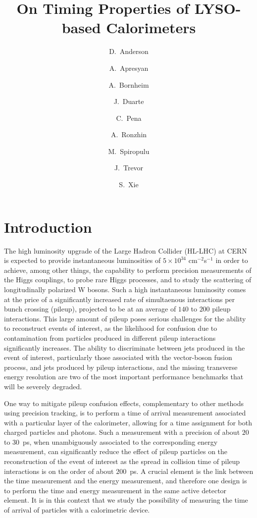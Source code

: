 \documentclass[12pt]{article}
\title{On Timing Properties of LYSO-based Calorimeters}
\author[1]{D.~Anderson}
\author[1]{A.~Apresyan}
\author[1]{A.~Bornheim}
\author[1]{J.~Duarte}
\author[1]{C.~Pena}
\author[2]{A.~Ronzhin}
\author[1]{M.~Spiropulu}
\author[1]{J.~Trevor}
\author[1]{S.~Xie}
\affil[1]{California Institute of Technology, Pasadena, CA, USA}
\affil[2]{Fermi National Accelerator Laboratory, Batavia, IL, USA}
\date{}
\begin{document}
\maketitle
{}



\section{Introduction}

The high luminosity upgrade of the Large Hadron Collider (HL-LHC) at
CERN~\cite{Rossi:1471000} is expected to provide instantaneous luminosities of
$5\times10^{34}$ cm$^{-2}$s$^{-1}$ in order to achieve, among other things, the
capability to perform precision measurements of the Higgs couplings, to probe
rare Higgs processes, and to study the scattering of longitudinally polarized W
bosons. Such a high instantaneous luminosity comes at the price of a
significantly increased rate of simultaenous interactions per bunch crossing
(pileup), projected to be at an average of $140$ to $200$ pileup interactions.
This large amount of pileup poses serious challenges for the ability to
reconstruct events of interest, as the likelihood for confusion due to
contamination from particles produced in different pileup interactions
significantly increases. The ability to discriminate between jets produced in
the event of interest, particularly those associated with the vector-boson
fusion process, and jets produced by pileup interactions, and the missing
transverse energy resolution are two of the most important performance
benchmarks that will be severely degraded.

One way to mitigate pileup confusion effects, complementary to other methods
using precision tracking, is to perform a time of arrival measurement associated
with a particular layer of the calorimeter, allowing for a time assignment for
both charged particles and photons. Such a measurement with a precision of about
$20$ to $30$~ps, when unambiguously associated to the corresponding energy
measurement, can significantly reduce the effect of pileup particles on the
reconstruction of the event of interest as the spread in collision time of
pileup interactions is on the order of about $200$~ps. A crucial element is the
link between the time measurement and the energy measurement, and therefore one
design is to perform the time and energy measurement in the same active detector
element. It is in this context that we study the possibility of measuring the
time of arrival of particles with a calorimetric device.
\end{document}
